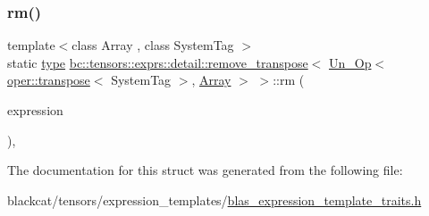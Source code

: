 \subsubsection{\texorpdfstring{rm()}{rm()}}
{\footnotesize\ttfamily template$<$class Array , class System\+Tag $>$ \\
static \hyperlink{structbc_1_1tensors_1_1exprs_1_1detail_1_1remove__transpose_3_01Un__Op_3_01oper_1_1transpose_3_0108540817e9a89440300c45967e20325_a521fa80fb0c4e801cfb8737883703a82}{type} \hyperlink{structbc_1_1tensors_1_1exprs_1_1detail_1_1remove__transpose}{bc\+::tensors\+::exprs\+::detail\+::remove\+\_\+transpose}$<$ \hyperlink{structbc_1_1tensors_1_1exprs_1_1Un__Op}{Un\+\_\+\+Op}$<$ \hyperlink{structbc_1_1oper_1_1transpose}{oper\+::transpose}$<$ System\+Tag $>$, \hyperlink{structbc_1_1tensors_1_1exprs_1_1Array}{Array} $>$ $>$\+::rm (\begin{DoxyParamCaption}\item[{\hyperlink{structbc_1_1tensors_1_1exprs_1_1Un__Op}{Un\+\_\+\+Op}$<$ \hyperlink{structbc_1_1oper_1_1transpose}{oper\+::transpose}$<$ System\+Tag $>$, \hyperlink{structbc_1_1tensors_1_1exprs_1_1Array}{Array} $>$}]{expression }\end{DoxyParamCaption})\hspace{0.3cm}{\ttfamily [inline]}, {\ttfamily [static]}}



The documentation for this struct was generated from the following file\+:\begin{DoxyCompactItemize}
\item 
blackcat/tensors/expression\+\_\+templates/\hyperlink{blas__expression__template__traits_8h}{blas\+\_\+expression\+\_\+template\+\_\+traits.\+h}\end{DoxyCompactItemize}
